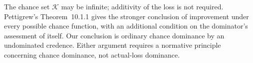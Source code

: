 \documentclass[11pt]{article}
\theoremstyle{definition}
\theoremstyle{remark}
\begin{document}
The chance set $\mathcal K$ may be infinite; additivity of the loss is not required. Pettigrew's Theorem~10.1.1 gives the stronger conclusion of improvement under every possible chance function, with an additional condition on the dominator's assessment of itself. Our conclusion is ordinary chance dominance by an undominated credence. Either argument requires a normative principle concerning chance dominance, not actual-loss dominance.




\end{document}
